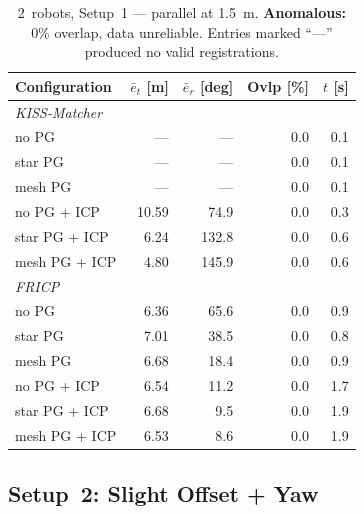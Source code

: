 \begin{table}[htbp]
    \centering
    \caption{2~robots, Setup~1 --- parallel at \SI{1.5}{\metre}.
             \textbf{Anomalous:} 0\% overlap, data unreliable.
             Entries marked ``---'' produced no valid registrations.}
    \label{tab:app_2r_s1}
    \small
    \begin{tabular}{l r r r r}
        \toprule
        \textbf{Configuration}
            & $\bar{e}_t$ [m]
            & $\bar{e}_r$ [deg]
            & Ovlp [\%]
            & $t$ [s] \\
        \midrule
        \multicolumn{5}{l}{\textit{KISS-Matcher}} \\
        \quad no PG         & ---    & ---    & 0.0 & 0.1 \\
        \quad star PG       & ---    & ---    & 0.0 & 0.1 \\
        \quad mesh PG       & ---    & ---    & 0.0 & 0.1 \\
        \quad no PG + ICP   & 10.59  &  74.9  & 0.0 & 0.3 \\
        \quad star PG + ICP &  6.24  & 132.8  & 0.0 & 0.6 \\
        \quad mesh PG + ICP &  4.80  & 145.9  & 0.0 & 0.6 \\
        \midrule
        \multicolumn{5}{l}{\textit{FRICP}} \\
        \quad no PG         &  6.36  &  65.6  & 0.0 & 0.9 \\
        \quad star PG       &  7.01  &  38.5  & 0.0 & 0.8 \\
        \quad mesh PG       &  6.68  &  18.4  & 0.0 & 0.9 \\
        \quad no PG + ICP   &  6.54  &  11.2  & 0.0 & 1.7 \\
        \quad star PG + ICP &  6.68  &   9.5  & 0.0 & 1.9 \\
        \quad mesh PG + ICP &  6.53  &   8.6  & 0.0 & 1.9 \\
        \bottomrule
    \end{tabular}
\end{table}

\subsection{Setup~2: Slight Offset + Yaw}

